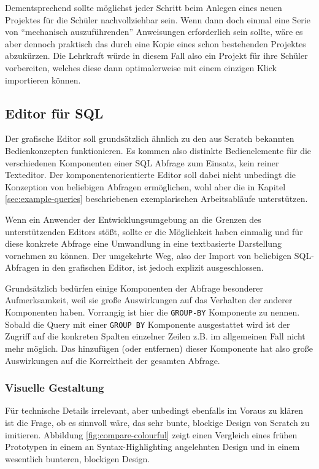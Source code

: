\documentclass[paper=a4,fontsize=11pt,parskip=half]{scrartcl}
\begin{document}
Dementsprechend sollte möglichst jeder Schritt beim Anlegen eines neuen Projektes für die Schüler nachvollziehbar sein. Wenn dann doch einmal eine Serie von ``mechanisch auszuführenden'' Anweisungen erforderlich sein sollte, wäre es aber dennoch praktisch das durch eine Kopie eines schon bestehenden Projektes abzukürzen. Die Lehrkraft würde in diesem Fall also ein Projekt für ihre Schüler vorbereiten, welches diese dann optimalerweise mit einem einzigen Klick importieren können.

\subsection{Editor für SQL}
\label{sec:design-sql-editor}

Der grafische Editor soll grundsätzlich ähnlich zu den aus Scratch bekannten Bedienkonzepten funktionieren. Es kommen also distinkte Bedienelemente für die verschiedenen Komponenten einer SQL Abfrage zum Einsatz, kein reiner Texteditor. Der komponentenorientierte Editor soll dabei nicht unbedingt die Konzeption von beliebigen Abfragen ermöglichen, wohl aber die in Kapitel \ref{sec:example-queries}  beschriebenen exemplarischen Arbeitsabläufe unterstützen. 

Wenn ein Anwender der Entwicklungsumgebung an die Grenzen des unterstützenden Editors stößt, sollte er die Möglichkeit haben einmalig und für diese konkrete Abfrage eine Umwandlung in eine textbasierte Darstellung vornehmen zu können. Der umgekehrte Weg, also der Import von beliebigen SQL-Abfragen in den grafischen Editor, ist jedoch explizit ausgeschlossen.

Grundsätzlich bedürfen einige Komponenten der Abfrage besonderer Aufmerksamkeit, weil sie große Auswirkungen auf das Verhalten der anderer Komponenten haben. Vorrangig ist hier die \texttt{GROUP-BY} Komponente zu nennen. Sobald die Query mit einer \texttt{GROUP BY} Komponente ausgestattet wird ist der Zugriff auf die konkreten Spalten einzelner Zeilen z.B. im allgemeinen Fall nicht mehr möglich. Das hinzufügen (oder entfernen) dieser Komponente hat also große Auswirkungen auf die Korrektheit der gesamten Abfrage.

\subsubsection{Visuelle Gestaltung}

Für technische Details irrelevant, aber unbedingt ebenfalls im Voraus zu klären ist die Frage, ob es sinnvoll wäre, das sehr bunte, blockige Design von Scratch zu imitieren. Abbildung \ref{fig:compare-colourful} zeigt einen Vergleich eines frühen Prototypen in einem an Syntax-Highlighting angelehnten Design und in einem wesentlich bunteren, blockigen Design.
\end{document}
